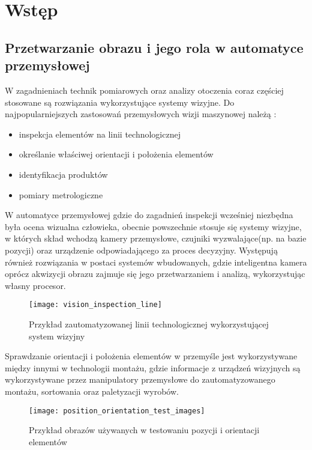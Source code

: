\documentclass[document.tex]{subfiles}
\begin{document}
\chapter{Wstęp}

\section{Przetwarzanie obrazu i jego rola w automatyce przemysłowej}
	\indent W zagadnieniach technik pomiarowych oraz analizy otoczenia coraz częściej stosowane
	są rozwiązania wykorzystujące systemy wizyjne. Do najpopularniejszych zastosowań przemysłowych wizji maszynowej należą \cite{Machine_Vision_Intro}:
	\begin{itemize}
		\item inspekcja elementów na linii technologicznej
		\item określanie właściwej orientacji i położenia elementów
		\item identyfikacja produktów
		\item pomiary metrologiczne		
	\end{itemize}
	\indent W automatyce przemysłowej gdzie do zagadnień inspekcji
	wcześniej niezbędna była ocena wizualna człowieka, obecnie powszechnie stosuje się systemy wizyjne, 
	w których skład wchodzą kamery przemysłowe, czujniki wyzwalające(np. na bazie pozycji) oraz urządzenie odpowiadającego za proces decyzyjny.
	Występują również rozwiązania w postaci systemów wbudowanych, gdzie inteligentna kamera oprócz
	akwizycji obrazu zajmuje się jego przetwarzaniem i analizą, wykorzystując własny procesor.\cite{Machine_Vision_Intro}\cite{Davies_Machine_Vision}
	

	\begin{figure}[h]
	\texttt{[image: vision\_inspection\_line]}
	\caption{Przykład zautomatyzowanej linii technologicznej wykorzystującej system wizyjny\protect\cite{Vision_systems_article}}
	\label{fig:inspekcja}
	\end{figure}

	\indent Sprawdzanie orientacji i położenia elementów w przemyśle jest wykorzystywane
	między innymi w technologii montażu, gdzie informacje z urządzeń wizyjnych są wykorzystywane
	przez manipulatory przemysłowe do zautomatyzowanego montażu, sortowania oraz paletyzacji wyrobów.\cite{Machine_Vision_Intro}

	\begin{figure}[h]
	\texttt{[image: position\_orientation\_test\_images]}
	\caption{Przykład obrazów używanych w testowaniu pozycji i orientacji elementów\protect\cite{Machine_Vision_Intro}}
	\label{fig:pozycja_orientacja}
	\end{figure}	
\end{document}
